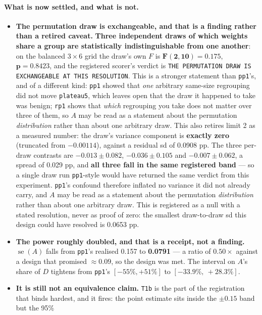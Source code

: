 \documentclass[10pt,letterpaper]{article}
\newcommand{\Dstat}{D}                         %
\newcommand{\Astat}{A}                         %
\newcommand{\plateau}{\texttt{plateau5}}
\newcommand{\arm}[1]{\texttt{#1}}
\DeclareMathOperator{\se}{se}
\begin{document}
\paragraph{What is now settled, and what is not.}
\begin{itemize}
\item \textbf{The permutation draw is exchangeable, and that is a finding rather than a retired
  caveat.} \textbf{Three independent draws of which weights share a group are statistically
  indistinguishable from one another}: on the balanced $3 \times 6$ grid the draw's own $F$ is
  $\mathbf{F(2,10) = 0.175}$, $\mathbf{p = 0.8423}$, and the registered scorer's verdict is
  \texttt{THE PERMUTATION DRAW IS EXCHANGEABLE AT THIS RESOLUTION}. This is a stronger statement
  than \arm{pp1}'s, and of a different kind: \arm{pp1} showed that \emph{one} arbitrary
  same-size regrouping did not move \plateau{}, which leaves open that the draw it happened to
  take was benign; \arm{rp1} shows that \emph{which} regrouping you take does not matter over
  three of them, so $\Astat$ may be read as a statement about the permutation \emph{distribution}
  rather than about one arbitrary draw. This also retires limit 2 as a measured number: the
  draw's variance component is \textbf{exactly zero} (truncated from $-0.00114$), against a
  residual sd of 0.0908 pp. The three per-draw contrasts are $-0.013 \pm 0.082$,
  $-0.036 \pm 0.105$ and $-0.007 \pm 0.062$, a spread of 0.029 pp, and \textbf{all three fall in
  the same registered band} --- so a single draw run \arm{pp1}-style would have returned the same
  verdict from this experiment. \arm{pp1}'s confound therefore inflated no variance it did not
  already carry, and $\Astat$ may be read as a statement about the permutation \emph{distribution}
  rather than about one arbitrary draw. This is registered as a null with a stated resolution,
  never as proof of zero: the smallest draw-to-draw sd this design could have resolved is
  0.0653 pp.
\item \textbf{The power roughly doubled, and that is a receipt, not a finding.} $\se(\Astat)$ falls
  from \arm{pp1}'s realised 0.157 to \textbf{0.0791} --- a ratio of $0.50\times$ against a design
  that promised $\approx 0.09$, so the design was met. The interval on $\Astat$'s share of $\Dstat$
  tightens from \arm{pp1}'s $[-55\%, +51\%]$ to $\mathbf{[-33.9\%,\ +28.3\%]}$.
\item \textbf{It is still not an equivalence claim.} \texttt{T1b} is the part of the registration
  that binds hardest, and it fires: the point estimate sits inside the $\pm 0.15$ band but the 95\%

\end{itemize}
\end{document}
